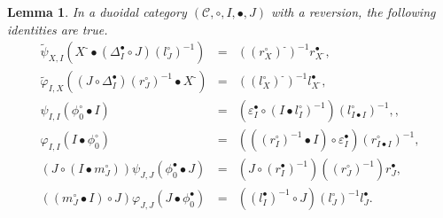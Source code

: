 \documentclass[nosumlimits,twoside]{amsart}
\newtheorem{lemma}[lemma]{\sc Lemma}
\theoremstyle{definition}
\theoremstyle{remark}
\def\revsn{\text{-}}
\newcommand{\Cc}{\mathcal{C}}
\begin{document}
\begin{lemma}
In a duoidal category $(\Cc,\circ,I,\bullet,J)$ with a reversion, the following identities are true.
\begin{eqnarray}
\widetilde{\psi }_{X,I}
\left( X^{\revsn }\bullet \left( \Delta _{I}^{\bullet }\circ J\right) \left(
l_{J}^{\circ }\right) ^{-1}\right) &=&((r_X^\circ)^\revsn)^{-1}r_{X^\revsn}^\bullet ,\label{eq:BohmphiR}
\\
{\widetilde{\varphi }%
_{I,X}}\left( \left( J\circ \Delta _{I}^{\bullet }\right) \left(
r_{J}^{\circ }\right) ^{-1}\bullet X^{\revsn }\right) &=&((l_X^\circ)^\revsn)^{-1}l_{X^\revsn}^\bullet ,\label{eq:BohmphiL}\\
\psi _{I,I}\left( \phi _{0}^{\circ}\bullet I\right)
&=&\left(\varepsilon _{I}^{\bullet }\circ \left( I\bullet
l_{I}^{\circ }\right) ^{-1}\right) \left( l_{I\bullet I}^{\circ }\right)
^{-1}, \label{eq:psiphi0},\\
\varphi _{I,I}\left( I\bullet \phi _{0}^{\circ}\right)&=&\left( \left( \left(
r_{I}^{\circ }\right) ^{-1}\bullet I\right) \circ \varepsilon _{I}^{\bullet }\right) \left(
r_{I\bullet I}^{\circ }\right) ^{-1}, \label{eq:phiphi0}\\
\left( J\circ \left( I\bullet
m_{J}^{\circ }\right) \right) \psi _{J,J}\left( \phi
_{0}^{\bullet }\bullet J\right)&=&\left( J\circ \left( r_{I}^{\bullet }\right) ^{-1}\right) \left( \left(
r_{J}^{\circ }\right) ^{-1}\right)r_{J}^{\bullet },\label{eq:psiphi0bul} \\
 \left( \left( m_{J}^{\circ }\bullet I\right) \circ J\right)\varphi _{J,J}\left( J\bullet
\phi _{0}^{\bullet }\right) &=& \left( \left( l_{I}^{\bullet }\right)
^{-1}\circ J\right) \left( l_{J}^{\circ }\right) ^{-1}l_J^\bullet.\label{eq:phiphi0bul}
\end{eqnarray}
\end{lemma}
\end{document}
